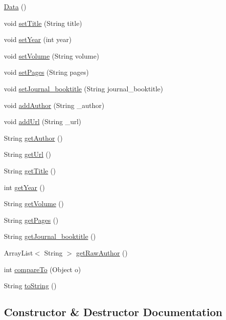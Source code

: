 \begin{DoxyCompactItemize}
\item 
\hyperlink{class_data_ac9188dcb0fca3b16e8111ce3ee5c2a1c}{Data} ()
\item 
void \hyperlink{class_data_a4efe69d1a38809de935950b0c344ac94}{set\+Title} (String title)
\item 
void \hyperlink{class_data_a03a832c4735f73cf7ffd55ab0261c1aa}{set\+Year} (int year)
\item 
void \hyperlink{class_data_a7112127b737cbae7671940486a3a2f2f}{set\+Volume} (String volume)
\item 
void \hyperlink{class_data_a368b24c15d79a0ec0c33f031f489d616}{set\+Pages} (String pages)
\item 
void \hyperlink{class_data_a18f402932ef14e0f351e9419def6d840}{set\+Journal\+\_\+booktitle} (String journal\+\_\+booktitle)
\item 
void \hyperlink{class_data_aee77b766926cff5acb486c8993c39607}{add\+Author} (String \+\_\+author)
\item 
void \hyperlink{class_data_a0f3fd3bbb22e15759be23fc1bf8a54b9}{add\+Url} (String \+\_\+url)
\item 
String \hyperlink{class_data_a4163034911e6f4b0b3e4bd2135824c5f}{get\+Author} ()
\item 
String \hyperlink{class_data_ae19e8172a648699e26eceab342383e4d}{get\+Url} ()
\item 
String \hyperlink{class_data_abed831f7e25a9173f7120dbf9bbac2bd}{get\+Title} ()
\item 
int \hyperlink{class_data_afd9f8a0a7ddf04b40ac2c6a038f61e68}{get\+Year} ()
\item 
String \hyperlink{class_data_a57d3cdf8d58ca9761c9c1873a352ad9e}{get\+Volume} ()
\item 
String \hyperlink{class_data_a7c34cb99f132d8fb526462d59a033aa8}{get\+Pages} ()
\item 
String \hyperlink{class_data_ac1e4612845513c0826716962bcad943c}{get\+Journal\+\_\+booktitle} ()
\item 
Array\+List$<$ String $>$ \hyperlink{class_data_a3e01a97f8e6695e9ae4bbdfb4e012127}{get\+Raw\+Author} ()
\item 
int \hyperlink{class_data_af0585a116e5d386a0d513b8f1549411a}{compare\+To} (Object o)
\item 
String \hyperlink{class_data_a7c190e5a2f3f11629a13a90d05e9e1cf}{to\+String} ()
\end{DoxyCompactItemize}


\subsection{Constructor \& Destructor Documentation}
\hypertarget{class_data_ac9188dcb0fca3b16e8111ce3ee5c2a1c}{}\label{class_data_ac9188dcb0fca3b16e8111ce3ee5c2a1c} 
